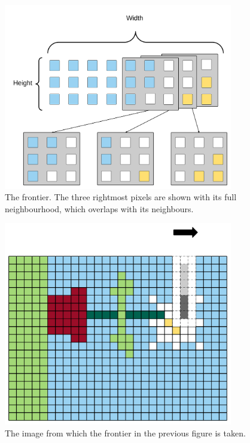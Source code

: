 \begin{figure}[h!]
    \centering
    \includegraphics[width=10cm]{img/frontier1.png}
    \caption{The frontier. The three rightmost pixels are shown with its full neighbourhood, which overlaps with its neighbours.}
    \label{fig:frontier1}
\end{figure}

\begin{figure}[h!]
    \centering
    \includegraphics[width=10cm]{img/frontier2.png}
    \caption{The image from which the frontier in the previous figure is taken.}
    \label{fig:frontier2}
\end{figure}

